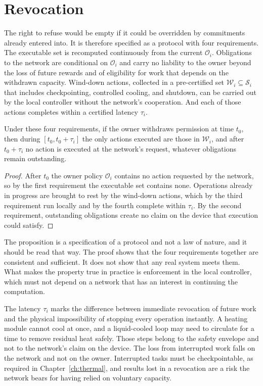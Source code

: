 \section{Revocation}

The right to refuse would be empty if it could be overridden by commitments already entered into. It is therefore specified as a protocol with four requirements. The executable set is recomputed continuously from the current $\mathcal O_i$. Obligations to the network are conditional on $\mathcal O_i$ and carry no liability to the owner beyond the loss of future rewards and of eligibility for work that depends on the withdrawn capacity. Wind-down actions, collected in a pre-certified set $\mathcal W_i\subseteq\mathcal S_i$ that includes checkpointing, controlled cooling, and shutdown, can be carried out by the local controller without the network's cooperation. And each of those actions completes within a certified latency $\tau_i$.

\begin{proposition}
\label{prop:revocation}
Under these four requirements, if the owner withdraws permission at time $t_0$, then during $[t_0,t_0+\tau_i]$ the only actions executed are those in $\mathcal W_i$, and after $t_0+\tau_i$ no action is executed at the network's request, whatever obligations remain outstanding.
\end{proposition}

\begin{proof}
After $t_0$ the owner policy $\mathcal O_i$ contains no action requested by the network, so by the first requirement the executable set contains none. Operations already in progress are brought to rest by the wind-down actions, which by the third requirement run locally and by the fourth complete within $\tau_i$. By the second requirement, outstanding obligations create no claim on the device that execution could satisfy.
\end{proof}

The proposition is a specification of a protocol and not a law of nature, and it should be read that way. The proof shows that the four requirements together are consistent and sufficient. It does not show that any real system meets them. What makes the property true in practice is enforcement in the local controller, which must not depend on a network that has an interest in continuing the computation.

The latency $\tau_i$ marks the difference between immediate revocation of future work and the physical impossibility of stopping every operation instantly. A heating module cannot cool at once, and a liquid-cooled loop may need to circulate for a time to remove residual heat safely. Those steps belong to the safety envelope and not to the network's claim on the device. The loss from interrupted work falls on the network and not on the owner. Interrupted tasks must be checkpointable, as required in Chapter~\ref{ch:thermal}, and results lost in a revocation are a risk the network bears for having relied on voluntary capacity.

